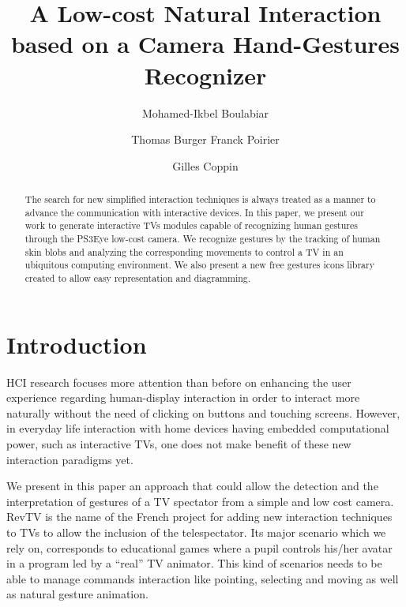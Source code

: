 \documentclass{llncs}
\begin{document}
\frontmatter          %
\pagestyle{headings}  %
\mainmatter              %
%
\title{A Low-cost Natural Interaction based on a Camera Hand-Gestures Recognizer}
\author{Mohamed-Ikbel Boulabiar \and Thomas Burger
Franck Poirier \and Gilles Coppin}
%

\maketitle

\begin{abstract}
The search for new simplified interaction techniques is always treated as a
manner to advance the communication with interactive devices.
In this paper, we present our work to generate interactive TVs modules capable
of recognizing human gestures through the PS3Eye low-cost camera.
We recognize gestures by the tracking of human skin blobs and analyzing the 
corresponding movements to control a TV in an ubiquitous computing environment.
We also present a new free gestures icons library created to allow easy
representation and diagramming.

\end{abstract}
%

\section{Introduction}
HCI research focuses more attention than before on enhancing the user experience
regarding human-display interaction in order to interact more naturally without
the need of clicking on buttons and touching screens. However, in everyday life
interaction with home devices having embedded computational power, such as
interactive TVs, one does not make benefit of these new interaction paradigms yet. 

We present in this paper an approach that could allow the detection and the
interpretation of gestures of a TV spectator from a simple and low cost camera. 
RevTV is the name of the French project for adding new interaction techniques
to TVs to allow the inclusion of the telespectator.
Its major scenario which we rely on, corresponds to educational games where a
pupil controls his/her avatar in a program led by a ``real'' TV animator.
This kind of scenarios needs to be able to manage commands interaction
like pointing, selecting and moving as well as natural gesture animation.
\end{document}

